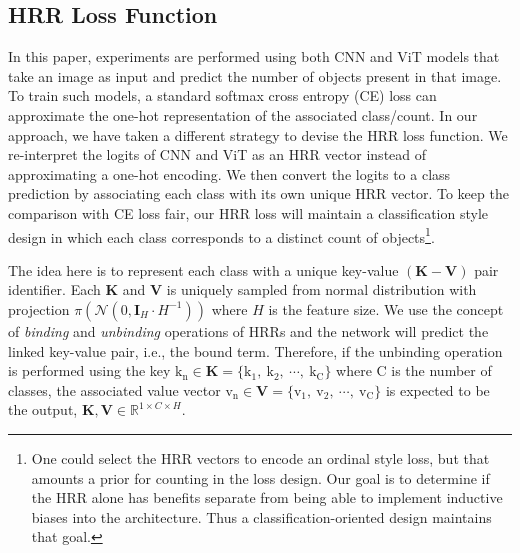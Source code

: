 \documentclass[letterpaper]{article} %
\begin{document}
\subsection{HRR Loss Function}
In this paper, experiments are performed using both CNN and ViT models that take an image as input and predict the number of objects present in that image. To train such models, a standard softmax cross entropy (CE) loss can approximate the one-hot representation of the associated class/count. In our approach, we have taken a different strategy to devise the HRR loss function. We re-interpret the logits of CNN and ViT as an HRR vector instead of approximating a one-hot encoding. We then convert the logits to a class prediction by associating each class with its own unique HRR vector. To keep the comparison with CE loss fair, our HRR loss will maintain a classification style design in which each class corresponds to a distinct count of objects\footnote{One could select the HRR vectors to encode an ordinal style loss, but that amounts a prior for counting in the loss design. Our goal is to determine if the HRR alone has benefits separate from being able to implement inductive biases into the architecture. Thus a classification-oriented design maintains that goal.}.
\par
The idea here is to represent each class with a unique key-value $(\mathbf{K}-\mathbf{V})$ pair identifier. Each $\mathbf{K}$ and $\mathbf{V}$ is uniquely sampled from normal distribution with projection $\pi(\mathcal{N}(0, \mathbf{I}_H \cdot H^{-1}))$ where $H$ is the feature size. We use the concept of \emph{binding} and \emph{unbinding} operations of HRRs and the network will predict the linked key-value pair, i.e., the bound term. Therefore, if the unbinding operation is performed using the key $\mathrm{k}_\mathrm{n} \in \mathbf{K} = \{\mathrm{k}_1,~\mathrm{k}_2,~\cdots,~\mathrm{k}_\mathrm{C}\}$ where $\mathrm{C}$ is the number of classes, the associated value vector $\mathrm{v}_\mathrm{n} \in \mathbf{V} = \{\mathrm{v}_1,~\mathrm{v}_2,~\cdots,~\mathrm{v}_\mathrm{C}\}$ is expected to be the output,
$\mathbf{K}, \mathbf{V} \in \mathbb{R}^{1 \times C \times H}$.
\end{document}
